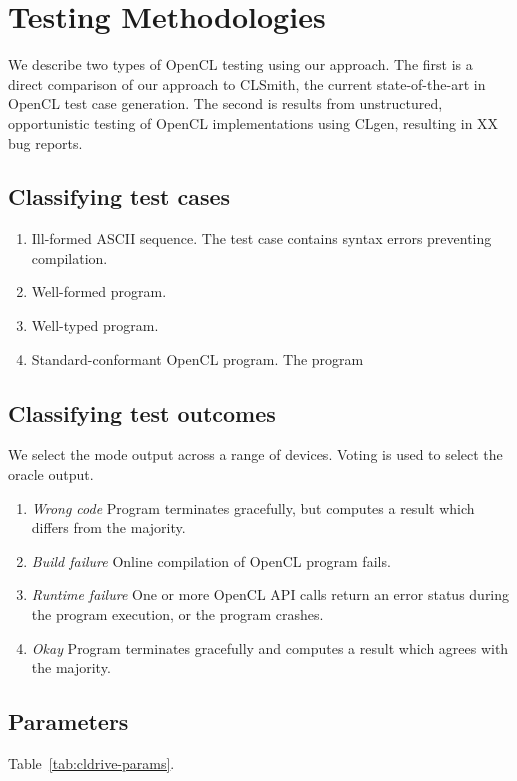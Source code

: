 \section{Testing Methodologies}\label{sec:methodology}

We describe two types of OpenCL testing using our approach. The first is a direct comparison of our approach to CLSmith, the current state-of-the-art in OpenCL test case generation. The second is results from unstructured, opportunistic testing of OpenCL implementations using CLgen, resulting in XX bug reports.

\subsection{Classifying test cases}


\begin{enumerate}
  \item Ill-formed ASCII sequence. The test case contains syntax errors preventing compilation.
  \item Well-formed program.
  \item Well-typed program.
  \item Standard-conformant OpenCL program. The program
\end{enumerate}

\subsection{Classifying test outcomes}

We select the mode output across a range of devices. Voting is used to select the oracle output.
%
\begin{enumerate}
	\item \emph{Wrong code} Program terminates gracefully, but computes a result which differs from the majority.
	\item \emph{Build failure} Online compilation of OpenCL program fails.
	\item \emph{Runtime failure} One or more OpenCL API calls return an error status during the program execution, or the program crashes.
	\item \emph{Okay} Program terminates gracefully and computes a result which agrees with the majority.
\end{enumerate}


\subsection{Parameters}

Table~\ref{tab:cldrive-params}. 
